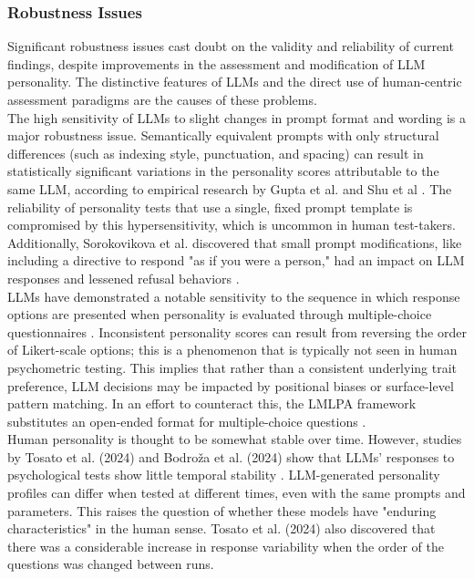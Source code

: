 \documentclass{DESSThesis}
\begin{document}
\subsubsection{Robustness Issues}
Significant robustness issues cast doubt on the validity and reliability of current findings, despite improvements in the assessment and modification of LLM personality. The distinctive features of LLMs and the direct use of human-centric assessment paradigms are the causes of these problems.
\\
The high sensitivity of LLMs to slight changes in prompt format and wording is a major robustness issue. Semantically equivalent prompts with only structural differences (such as indexing style, punctuation, and spacing) can result in statistically significant variations in the personality scores attributable to the same LLM, according to empirical research by Gupta et al. and Shu et al \cite{gupta_self-assessment_2024,shu_you_2024}. The reliability of personality tests that use a single, fixed prompt template is compromised by this hypersensitivity, which is uncommon in human test-takers. Additionally, Sorokovikova et al. discovered that small prompt modifications, like including a directive to respond "as if you were a person," had an impact on LLM responses and lessened refusal behaviors \cite{sorokovikova_llms_2024}.
\\
LLMs have demonstrated a notable sensitivity to the sequence in which response options are presented when personality is evaluated through multiple-choice questionnaires \cite{gupta_self-assessment_2024,zheng_lmlpa_2024}. Inconsistent personality scores can result from reversing the order of Likert-scale options; this is a phenomenon that is typically not seen in human psychometric testing. This implies that rather than a consistent underlying trait preference, LLM decisions may be impacted by positional biases or surface-level pattern matching. In an effort to counteract this, the LMLPA framework substitutes an open-ended format for multiple-choice questions \cite{zheng_lmlpa_2024}.
\\
Human personality is thought to be somewhat stable over time. However, studies by Tosato et al. (2024) and Bodroža et al. (2024) show that LLMs' responses to psychological tests show little temporal stability \cite{bodroza_personality_2024,tommaso_llms_2024}. LLM-generated personality profiles can differ when tested at different times, even with the same prompts and parameters. This raises the question of whether these models have "enduring characteristics" in the human sense. Tosato et al. (2024) also discovered that there was a considerable increase in response variability when the order of the questions was changed between runs.
\end{document}
